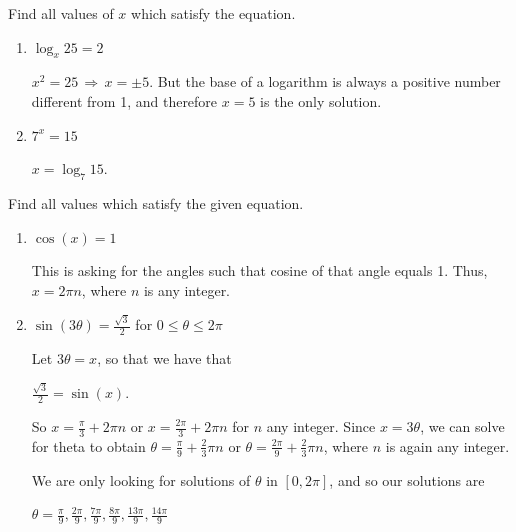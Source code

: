 \documentclass[handout,nooutcomes]{ximera}
\begin{document}
	
	
\begin{problem}
Find all values of $x$ which satisfy the equation.
	
			\begin{enumerate}
			
			\item  $\log_x 25=2$ 
			
			 \begin{freeResponse}			 
			 $x^2 = 25 \, \Longrightarrow \, x = \pm 5$.  But the base of a logarithm is always a positive number different from 1, and therefore $x = 5$ is the only solution. 
			 \end{freeResponse}
			
			\item  $7^x=15$ 
			
			 \begin{freeResponse}			 
			 $x = \log_{7} 15$. 
			 \end{freeResponse}
			
			\end{enumerate}
			
\end{problem}
			
			

\begin{problem}
Find all values which satisfy the given equation.
	
			\begin{enumerate}
			
			\item  $\cos (x)=1$ 
			
			 \begin{freeResponse}			 
			 This is asking for the angles such that cosine of that angle equals 1.  Thus, $x = 2 \pi n$, where $n$ is any integer.  
			 \end{freeResponse}
			
			\item  $\sin (3 \theta )=\frac{\sqrt{3}}{2}$ for $0 \leq \theta \leq 2\pi $
			
			 \begin{freeResponse}			 
			 Let $3 \theta = x$, so that we have that 
			
			$ \frac{\sqrt{3}}{2} = \sin(x) $.
			
			So $ x= \frac{\pi}{3} + 2 \pi n$ or $ x = \frac{2 \pi }{3} + 2 \pi n $ for $n$ any integer.  Since $x = 3 \theta$, we can solve for theta to obtain $ \theta = \frac{\pi}{9} + \frac{2}{3} \pi n $ or $ \theta = \frac{2 \pi }{9} + \frac{2}{3} \pi n $, where $n$ is again any integer.  
			
We are only looking for solutions of $\theta$ in $[0, 2 \pi ]$, and so our solutions are

$ \theta = \frac{\pi}{9}, \frac{2\pi}{9}, \frac{7\pi}{9}, \frac{8\pi}{9}, \frac{13\pi}{9}, \frac{14\pi}{9} $ 
			 \end{freeResponse}
			
			\end{enumerate}
			
\end{problem}
			
\end{document}
